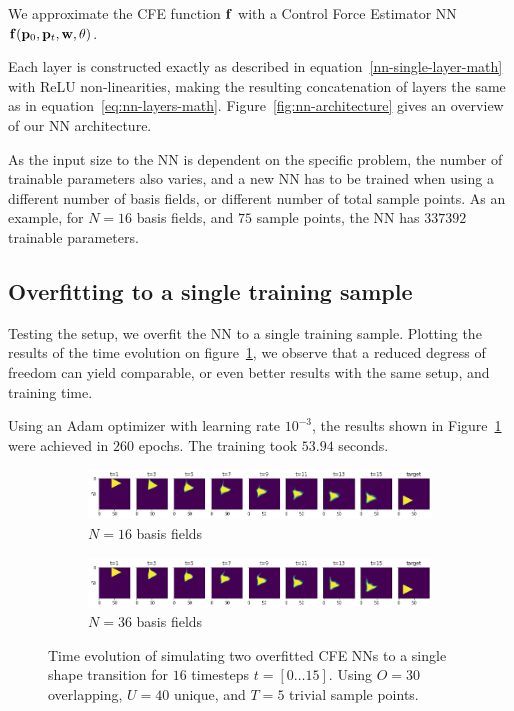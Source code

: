 We approximate the \ac{CFE} function $\vb{f}$ with a Control Force Estimator
\acf{NN} $\vb{f}(\vb{p}_0, \vb{p}_t, \vb{w}, \vb{\theta})$. 

Each layer is constructed exactly as described in
equation~\eqref{nn-single-layer-math} with ReLU non-linearities, making the
resulting concatenation of layers the same as in
equation~\eqref{eq:nn-layers-math}. Figure~\ref{fig:nn-architecture} gives an
overview of our \ac{NN} architecture. 



As the input size to the \ac{NN} is dependent on the specific problem, the
number of trainable parameters also varies, and a new \ac{NN} has to be trained
when using a different number of basis fields, or different number of total
sample points. As an example, for $N=16$ basis fields, and $75$ sample points,
the \ac{NN} has $337 392$ trainable parameters.

\subsection*{Overfitting to a single training sample}
Testing the setup, we overfit the \ac{NN} to a single training sample. Plotting
the results of the time evolution on figure~\ref{fig:NN-overfit}, we observe
that a reduced degress of freedom can yield comparable, or even better results
with the same setup, and training time. 

Using an Adam optimizer \cite{adam} with learning rate $10^{-3}$, the results
shown in Figure~\ref{fig:NN-overfit} were achieved in $260$ epochs. The
training took $53.94$ seconds.

\begin{figure}
  \centering
  \begin{subfigure}{\textwidth}
    \centering
    \includegraphics[width=\textwidth]{figures/nn-training/NN_N16_triangle_overfit_horizontal.png}
    \caption{$N=16$ basis fields}
  \end{subfigure}
  \begin{subfigure}{\textwidth}
    \centering
    \includegraphics[width=\textwidth]{figures/nn-training/NN_N36_triangle_overfit_horizontal.png}
    \caption{$N=36$ basis fields}
  \end{subfigure}
  \caption{Time evolution of simulating two overfitted \ac{CFE} \acp{NN} to
  a single shape transition for $16$ timesteps $t=[0\dots15]$. Using $O=30$
overlapping, $U=40$ unique, and $T=5$  trivial sample points.}
  \label{fig:NN-overfit}
\end{figure}

